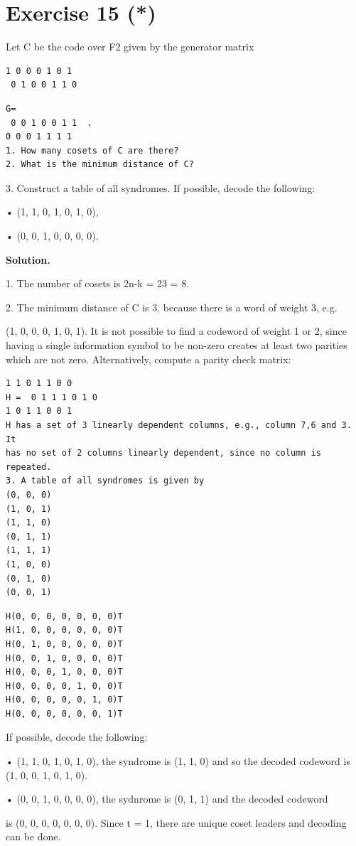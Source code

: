 \documentclass[11pt]{article}
\begin{document}
\section*{Exercise 15 (*)}
\begin{exercisebox}
Let C be the code over F2 given by the generator matrix

\begin{Verbatim}[fontsize=\small]
1 0 0 0 1 0 1
 0 1 0 0 1 1 0
\end{Verbatim}
\begin{Verbatim}[fontsize=\small]
G=
 0 0 1 0 0 1 1  .
0 0 0 1 1 1 1
1. How many cosets of C are there?
2. What is the minimum distance of C?
\end{Verbatim}
3. Construct a table of all syndromes. If possible, decode the following:

• (1, 1, 0, 1, 0, 1, 0),

• (0, 0, 1, 0, 0, 0, 0).

\end{exercisebox}
\begin{solutionbox}
\textbf{Solution.}

1. The number of cosets is 2n-k = 23 = 8.

2. The minimum distance of C is 3, because there is a word of weight 3, e.g.

(1, 0, 0, 0, 1, 0, 1). It is not possible to find a codeword of weight 1 or 2, since having a single information symbol to be non-zero creates at least two parities which are not zero. Alternatively, compute a parity check matrix:

\begin{Verbatim}[fontsize=\small]
1 1 0 1 1 0 0
H =  0 1 1 1 0 1 0
1 0 1 1 0 0 1
H has a set of 3 linearly dependent columns, e.g., column 7,6 and 3. It
has no set of 2 columns linearly dependent, since no column is repeated.
3. A table of all syndromes is given by
(0, 0, 0)
(1, 0, 1)
(1, 1, 0)
(0, 1, 1)
(1, 1, 1)
(1, 0, 0)
(0, 1, 0)
(0, 0, 1)
\end{Verbatim}
\begin{Verbatim}[fontsize=\small]
H(0, 0, 0, 0, 0, 0, 0)T
H(1, 0, 0, 0, 0, 0, 0)T
H(0, 1, 0, 0, 0, 0, 0)T
H(0, 0, 1, 0, 0, 0, 0)T
H(0, 0, 0, 1, 0, 0, 0)T
H(0, 0, 0, 0, 1, 0, 0)T
H(0, 0, 0, 0, 0, 1, 0)T
H(0, 0, 0, 0, 0, 0, 1)T
\end{Verbatim}
If possible, decode the following:

• (1, 1, 0, 1, 0, 1, 0), the syndrome is (1, 1, 0) and so the decoded codeword is (1, 0, 0, 1, 0, 1, 0).

• (0, 0, 1, 0, 0, 0, 0), the sydnrome is (0, 1, 1) and the decoded codeword

is (0, 0, 0, 0, 0, 0, 0). Since t = 1, there are unique coset leaders and decoding can be done.

\end{solutionbox}
\end{document}
